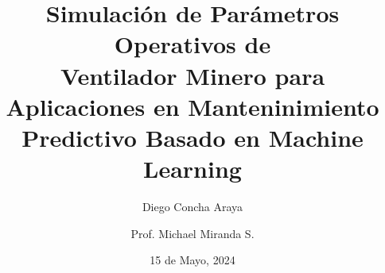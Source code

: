 




\title[Ventilador minero y mantenimiento predictivo]{Simulación de Parámetros Operativos de\\ Ventilador Minero para Aplicaciones en Manteninimiento\\Predictivo Basado en Machine Learning}
\author[Concha Araya]{Diego Concha Araya \and Prof. Michael Miranda S.}
\date{15 de Mayo, 2024}










